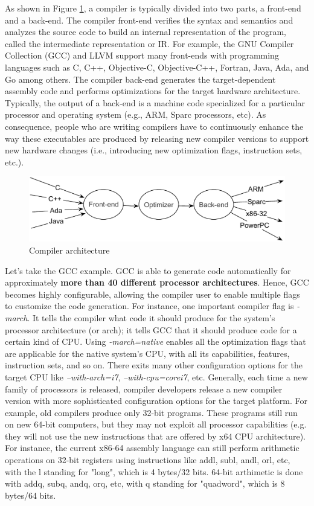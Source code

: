As shown in Figure \ref{fig:compilers}, a compiler is typically divided into two parts, a front-end and a back-end. The compiler front-end verifies the syntax and semantics and analyzes the source code to build an internal representation of the program, called the intermediate representation or IR. For example, the GNU Compiler Collection (GCC) and LLVM support many front-ends with programming languages such as C, C++, Objective-C, Objective-C++, Fortran, Java, Ada, and Go among others. The compiler back-end generates the target-dependent assembly code and performs optimizations for the target hardware architecture. Typically, the output of a back-end is a machine code specialized for a particular processor and operating system (e.g., ARM, Sparc processors, etc).
As consequence, people who are writing compilers have to continuously enhance the way these executables are produced by releasing new compiler versions to support new hardware changes (i.e., introducing new optimization flags, instruction sets, etc.). 
\begin{figure}[h]
	\center
	\includegraphics[scale=0.65]{Background/fig/compilers}
	\caption{Compiler architecture}
	\label{fig:compilers}
\end{figure}

Let's take the GCC example. GCC is able to generate code automatically for approximately \textbf{more than 40 different processor architectures}. Hence, GCC becomes highly configurable, allowing the compiler user to enable multiple flags to customize the code generation. For instance, one important compiler flag is \textit{-march}. It tells the compiler what code it should produce for the system's processor architecture (or arch); it tells GCC that it should produce code for a certain kind of CPU. Using \textit{-march=native} enables all the optimization flags that are applicable for the native system's CPU, with all its capabilities, features, instruction sets, and so on. There exits many other configuration options for the target CPU like \textit{--with-arch=i7}, \textit{--with-cpu=corei7}, etc.
Generally, each time a new family of processors is released, compiler developers release a new compiler version with more sophisticated configuration options for the target platform. For example, old compilers produce only 32-bit programs. These programs still run on new 64-bit computers, but they may not exploit all processor capabilities (e.g. they will not use the new instructions that are offered by x64 CPU architecture). For instance, the current x86-64 assembly language can still perform arithmetic operations on 32-bit registers using instructions like addl, subl, andl, orl, etc, with the l standing for "long", which is 4 bytes/32 bits. 64-bit arthimetic is done with addq, subq, andq, orq, etc, with q standing for "quadword", which is 8 bytes/64 bits.

